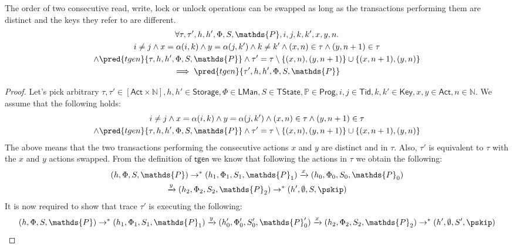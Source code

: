 \begin{lem}
	\label{lem:rwlu}
	The order of two consecutive read, write, lock or unlock operations can be swapped as long as the transactions performing them are distinct and the keys they refer to are different.
	\begin{gather*}
		\forall \tau, \tau', h, h', \Phi, S, \mathds{P}, i, j, k, k', x, y, n \ldotp \\
			i \neq j \land x = \alpha(i, k) \land y = \alpha(j, k') \land k \neq k' \land (x, n) \in \tau \land (y, n+1) \in \tau \\ \land \pred{tgen}{\tau, h, h', \Phi, S, \mathds{P}} \land \tau' = \tau \setminus \{(x, n), (y, n+1)\} \cup \{ (x, n+1), (y, n) \}
			\\	 
		 \implies \pred{tgen}{\tau', h, h', \Phi, S, \mathds{P}}
	\end{gather*}
	\begin{proof}
	Let's pick arbitrary $\tau, \tau' \in [\mathsf{Act} \times \mathds{N}], h, h' \in \mathsf{Storage}, \Phi \in \mathsf{LMan}, S \in \mathsf{TState}, \mathds{P} \in \mathsf{Prog}, i, j \in \mathsf{Tid}, k, k' \in \mathsf{Key}, x, y \in \mathsf{Act}, n \in \mathds{N}$. We assume that the following holds:
	\begin{gather}
		i \neq j \land x = \alpha(i, k) \land y = \alpha(j, k') \land (x, n) \in \tau \land (y, n+1) \in \tau \\ \land \pred{tgen}{\tau, h, h', \Phi, S, \mathds{P}} \land \tau' = \tau \setminus \{(x, n), (y, n+1)\} \cup \{ (x, n+1), (y, n) \}
	\end{gather}
	The above means that the two transactions performing the consecutive actions $x$ and $y$ are distinct and in $\tau$. Also, $\tau'$ is equivalent to $\tau$ with the $x$ and $y$ actions swapped. From the definition of $\mathsf{tgen}$ we know that following the actions in $\tau$ we obtain the following:
	\begin{gather}
		\label{lem:xy1} (h, \Phi, S, \mathds{P}) \rightarrow^* (h_1, \Phi_1, S_1, \mathds{P}_1) \xrightarrow{x} (h_0, \Phi_0, S_0, \mathds{P}_0) \\
		\label{lem:xy2} \xrightarrow{y} (h_2, \Phi_2, S_2, \mathds{P}_2) \rightarrow^* (h', \emptyset, S, \pskip)
	\end{gather}
	It is now required to show that trace $\tau'$ is executing the following:
	\[
		(h, \Phi, S, \mathds{P}) \rightarrow^* (h_1, \Phi_1, S_1, \mathds{P}_1) \xrightarrow{y} (h_0', \Phi_0', S_0', \mathds{P}_0') \xrightarrow{x} (h_2, \Phi_2, S_2, \mathds{P}_2) \rightarrow^* (h', \emptyset, S', \pskip)
\]
\end{proof}
\end{lem}
